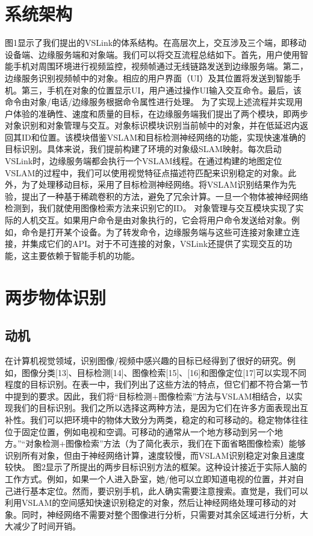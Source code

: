 \chapter{系统架构}
图1显示了我们提出的VSLink的体系结构。在高层次上，交互涉及三个端，即移动设备端、边缘服务端和对象端。我们可以将交互流程总结如下。首先，用户使用智能手机对周围环境进行视频监控，视频帧通过无线链路发送到边缘服务端。第二，边缘服务识别视频帧中的对象。相应的用户界面（UI）及其位置将发送到智能手机。第三，手机在对象的位置显示UI，用户通过操作UI输入交互命令。最后，该命令由对象/电话/边缘服务根据命令属性进行处理。
为了实现上述流程并实现用户体验的准确性、速度和质量的目标，在边缘服务端我们提出了两个模块，即两步对象识别和对象管理与交互。对象标识模块识别当前帧中的对象，并在低延迟内返回其ID和位置。该模块借鉴VSLAM和目标检测神经网络的功能，实现快速准确的目标识别。具体来说，我们提前构建了环境的对象级SLAM映射。每次启动VSLink时，边缘服务端都会执行一个VSLAM线程。在通过构建的地图定位VSLAM的过程中，我们可以使用视觉特征点描述符匹配来识别稳定的对象。此外，为了处理移动目标，采用了目标检测神经网络。将VSLAM识别结果作为先验，提出了一种基于稀疏卷积的方法，避免了冗余计算。一旦一个物体被神经网络检测到，我们就使用图像检索方法来识别它的ID。
对象管理与交互模块实现了实际的人机交互。如果用户命令是由对象执行的，它会将用户命令发送给对象。例如，命令是打开某个设备。为了转发命令，边缘服务端与这些可连接对象建立连接，并集成它们的API。对于不可连接的对象，VSLink还提供了实现交互的功能，这主要依赖于智能手机的功能。

\chapter{两步物体识别}
\section{动机}
在计算机视觉领域，识别图像/视频中感兴趣的目标已经得到了很好的研究。例如，图像分类[13]、目标检测[14]、图像检索[15]、[16]和图像定位[17]可以实现不同程度的目标识别。在表一中，我们列出了这些方法的特点，但它们都不符合第一节中提到的要求。因此，我们将“目标检测+图像检索”方法与VSLAM相结合，以实现我们的目标识别。我们之所以选择这两种方法，是因为它们在许多方面表现出互补性。我们可以把环境中的物体大致分为两类，稳定的和可移动的。稳定物体往往位于固定位置，例如电视和空调。可移动的通常从一个地方移动到另一个地方。”“对象检测+图像检索”方法（为了简化表示，我们在下面省略图像检索）能够识别所有对象，但由于神经网络计算，速度较慢，而VSLAM识别稳定对象且速度较快。
图2显示了所提出的两步目标识别方法的框架。这种设计接近于实际人脑的工作方式。例如，如果一个人进入卧室，她/他可以立即知道电视的位置，并对自己进行基本定位。然而，要识别手机，此人确实需要注意搜索。直觉是，我们可以利用VSLAM的空间感知快速识别稳定的对象，然后让神经网络处理可移动的对象。同时，神经网络不需要对整个图像进行分析，只需要对其余区域进行分析，大大减少了时间开销。
